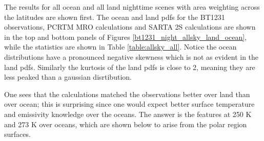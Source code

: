 \documentclass[agupp]{aguplus}              %
\newcommand{\wn}{cm$^{-1}$\xspace}
\begin{document}
\begin{article}


The results for all ocean and all land nighttime scenes with area weighting
across the latitudes are shown first. The ocean and land pdfs for the BT1231
observations, PCRTM MRO calculations and SARTA 2S calculations are
shown in the top and bottom panels of Figures \ref{bt1231_night_allsky_land_ocean}, 
while the statistics are shown in Table
\ref{table:allsky_all}. Notice the ocean distributions have a
pronounced negative skewness which is not as evident in the land
pdfs. Similarly the kurtosis of the land pdfs is close to 2, meaning they
are less peaked than a gaussian disrtibution.

One sees that the calculations matched the observations better over
land than over ocean; this is surprising since one would expect better
surface temperature and emissivity knowledge over the oceans. The
answer is the features at 250 K and 273 K over oceans, which are shown
below to arise from the polar region surfaces.


\end{article}
\end{document}
